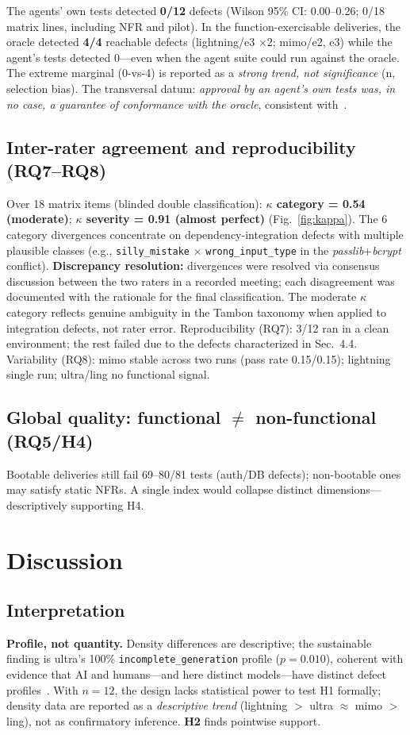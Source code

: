 \documentclass[sigconf,anonymous]{acmart}
\begin{document}
The agents' own tests detected \textbf{0/12} defects (Wilson 95\% CI: 0.00--0.26; 0/18 matrix lines, including NFR and pilot). In the function-exercisable deliveries, the oracle detected \textbf{4/4} reachable defects (lightning/e3 $\times$2; mimo/e2, e3) while the agent's tests detected 0---even when the agent suite could run against the oracle. The extreme marginal (0-vs-4) is reported as a \emph{strong trend, not significance} (n, selection bias). The transversal datum: \emph{approval by an agent's own tests was, in no case, a guarantee of conformance with the oracle}, consistent with~\cite{C03,C04,C05,C06}.

\subsection{Inter-rater agreement and reproducibility (RQ7--RQ8)}
Over 18 matrix items (blinded double classification): \textbf{$\kappa$ category = 0.54 (moderate)}; \textbf{$\kappa$ severity = 0.91 (almost perfect)} (Fig.~\ref{fig:kappa}). The 6 category divergences concentrate on dependency-integration defects with multiple plausible classes (e.g., \texttt{silly\_mistake} $\times$ \texttt{wrong\_input\_type} in the \emph{passlib}+\emph{bcrypt} conflict). \textbf{Discrepancy resolution:} divergences were resolved via consensus discussion between the two raters in a recorded meeting; each disagreement was documented with the rationale for the final classification. The moderate $\kappa$ category reflects genuine ambiguity in the Tambon taxonomy when applied to integration defects, not rater error. Reproducibility (RQ7): 3/12 ran in a clean environment; the rest failed due to the defects characterized in Sec.~4.4. Variability (RQ8): mimo stable across two runs (pass rate 0.15/0.15); lightning single run; ultra/ling no functional signal.

\subsection{Global quality: functional $\ne$ non-functional (RQ5/H4)}
Bootable deliveries still fail 69--80/81 tests (auth/DB defects); non-bootable ones may satisfy static NFRs. A single index would collapse distinct dimensions---descriptively supporting H4.

\section{Discussion}
\subsection{Interpretation}
\textbf{Profile, not quantity.} Density differences are descriptive; the sustainable finding is ultra's 100\% \texttt{incomplete\_generation} profile ($p=0.010$), coherent with evidence that AI and humans---and here distinct models---have distinct defect profiles~\cite{B03}. With $n=12$, the design lacks statistical power to test H1 formally; density data are reported as a \emph{descriptive trend} (lightning $>$ ultra $\approx$ mimo $>$ ling), not as confirmatory inference. \textbf{H2} finds pointwise support.
\end{document}
